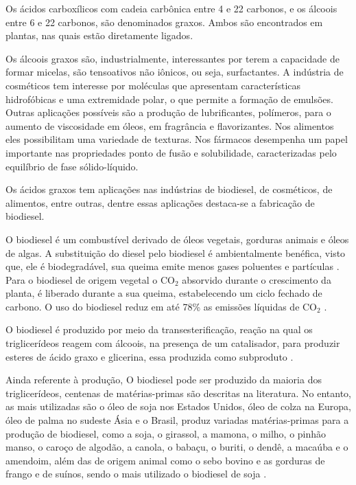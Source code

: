 Os ácidos carboxílicos com cadeia carbônica  entre 4 e 22 carbonos, e os  álcoois entre 6 e 22 carbonos, são denominados graxos. Ambos são encontrados em plantas, nas quais estão diretamente ligados.
    
Os álcoois graxos são, industrialmente, interessantes por terem a capacidade de formar micelas, são tensoativos não iônicos, ou seja, surfactantes. A indústria de cosméticos tem interesse por  moléculas que apresentam características hidrofóbicas e uma extremidade polar, o que permite a formação de emulsões. Outras aplicações possíveis são  a produção de lubrificantes,  polímeros, para o aumento de viscosidade em óleos,  em fragrância e flavorizantes. Nos alimentos eles possibilitam uma variedade de texturas. Nos  fármacos desempenha um papel importante nas propriedades  ponto de fusão e solubilidade, caracterizadas pelo equilíbrio de fase sólido-líquido. \cite{Barbosa2012}
    
Os ácidos graxos tem  aplicações nas indústrias de  biodiesel, de cosméticos, de alimentos, entre outras, dentre essas aplicações destaca-se  a fabricação de biodiesel. 

O biodiesel é um combustível  derivado de óleos vegetais, gorduras animais e óleos de algas. A substituição do diesel pelo biodiesel é ambientalmente benéfica, visto que, ele é biodegradável,  sua queima emite menos gases poluentes e  partículas \cite{Hanna1999,Atadashi2011}.   Para o biodiesel de origem vegetal  o CO$_2$  absorvido durante o crescimento da  planta,   é liberado durante a sua queima, estabelecendo um ciclo fechado de carbono. O uso do biodiesel reduz em até  78\% as emissões líquidas de CO$_2$ \cite{Aparecida2006}. 
    
O biodiesel é produzido por meio da transesterificação,  reação na qual  os triglicerídeos reagem com álcoois, na presença de um catalisador, para produzir esteres de  ácido graxo e glicerina, essa produzida como subproduto \cite{Hoekman2012}.
    
Ainda referente à produção, O  biodiesel pode ser produzido da maioria dos triglicerídeos, centenas de matérias-primas são descritas na literatura. No entanto, as mais  utilizadas são o óleo de soja nos Estados Unidos, óleo de colza na Europa, óleo de palma no sudeste Ásia e o Brasil, produz  variadas matérias-primas para a produção de biodiesel,  como a soja, o girassol, a mamona, o milho, o pinhão manso, o caroço de algodão, a canola, o babaçu, o buriti, o dendê, a macaúba e o amendoim, além das de origem animal como o sebo bovino e as gorduras de frango e de suínos, sendo o mais utilizado o biodiesel de soja \cite{Ramos2017,Hoekman2012}.
    
